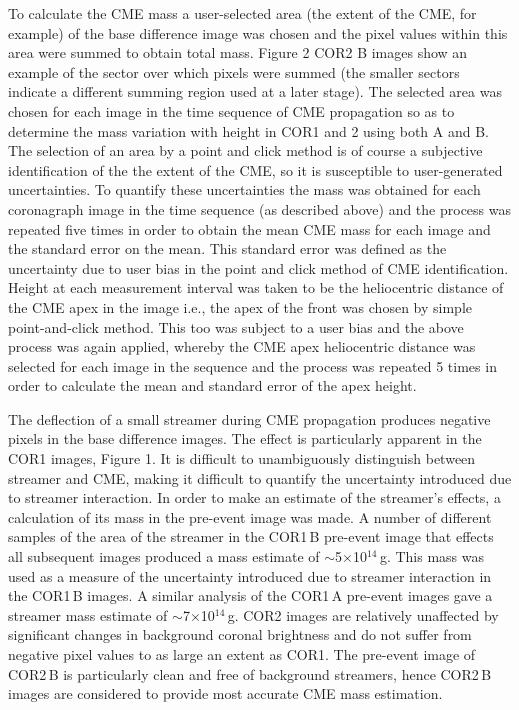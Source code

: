 \documentclass{emulateapj}
\begin{document}
To calculate the CME mass a user-selected area (the extent of the CME, for example) of the base difference image was chosen and the pixel values within this area were summed to obtain total mass. Figure 2 COR2 B images show an example of the sector over which pixels were summed (the smaller sectors indicate a different summing region used at a later stage).  
The selected area was chosen for each image in the time sequence of CME propagation so as to determine the mass variation with height in COR1 and 2 using both A and B. The selection of an area by a point and click method is of course a subjective identification of the the extent of the CME, so it is susceptible to user-generated uncertainties. To quantify these uncertainties the mass was obtained for each coronagraph image in the time sequence (as described above) and the process was repeated five times in order to obtain the mean CME mass for each image and the standard error on the mean. This standard error was defined as the uncertainty due to user bias in the point and click method of CME identification.
Height at each measurement interval was taken to be the heliocentric distance of the CME apex in the image i.e., the apex of the front was chosen by simple point-and-click method. This too was subject to a user bias and the above process was again applied, whereby the CME apex heliocentric distance was selected for each image in the sequence and the process was repeated 5 times in order to calculate the mean and standard error of the apex height. 

The deflection of a small streamer during CME propagation produces negative pixels in the base difference images. The effect is particularly apparent in the COR1 images, Figure 1. It is difficult to unambiguously distinguish between streamer and CME, making it difficult to quantify the uncertainty introduced due to streamer interaction. In order to make an estimate of the streamer's effects, a calculation of its mass in the pre-event image was made. A number of different samples of the area of the streamer in the COR1\,B pre-event image that effects all subsequent images produced a mass estimate of $\sim$5$\times$10$^{14}$\,g. This mass was used as a measure of the uncertainty introduced due to streamer interaction in the COR1\,B images. A similar analysis of the COR1\,A pre-event images gave a streamer mass estimate of $\sim$7$\times$10$^{14}$\,g. COR2 images are relatively unaffected by significant changes in background coronal brightness and do not suffer from negative pixel values to as large an extent as COR1. The pre-event image of COR2\,B is particularly clean and free of background streamers, hence COR2\,B images are considered to provide most accurate CME mass estimation.
\end{document}
